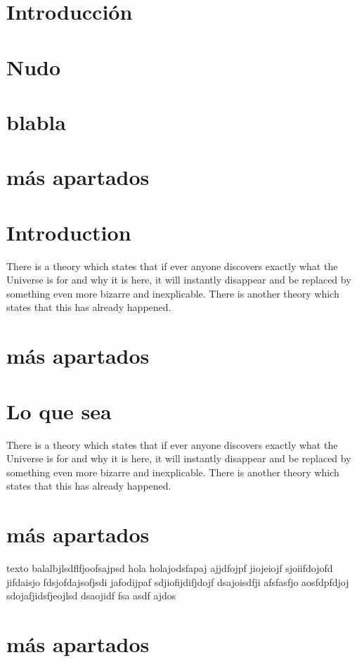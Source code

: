 \documentclass[12pt]{article}
\begin{document}

\tableofcontents
\pagebreak


\section{Introducción}
\section{Nudo}
\section{blabla}
\section{más apartados}
\section{Introduction}
There is a theory which states that if ever anyone discovers exactly what the Universe is for and why it is here, it will instantly disappear and be replaced by something even more bizarre and inexplicable.
There is another theory which states that this has already happened.
\section{más apartados}
\section{Lo que sea}
There is a theory which states that if ever anyone discovers exactly what the Universe is for and why it is here, it will instantly disappear and be replaced by something even more bizarre and inexplicable.
There is another theory which states that this has already happened.
\section{más apartados}
texto balalbjlsdflfjoofsajpsd hola holajodsfapaj ajjdfojpf jiojeiojf sjoiifdojofd jifdaisjo fdsjofdajsofjsdi jafodijpaf sdjiofijdifjdojf dsajoisdfji afsfasfjo aosfdpfdjoj sdojafjidsfjeojlsd dsaojidf fsa asdf ajdos
\section{más apartados}
\end{document}
